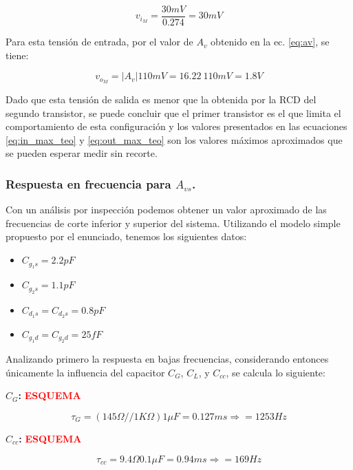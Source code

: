 \documentclass[a4paper, 10pt, spanish]{article}
\begin{document}
\begin{equation}
  v_{i_M}=\frac{30mV}{0.274}=30mV
  \label{eq:in_max_teo}
\end{equation}

Para esta tensión de entrada, por el valor de $A_v$ obtenido en la ec. \ref{eq:av}, se tiene:

\begin{equation}
  v_{o_M}=|A_v|110mV=16.22\ 110mV = 1.8V
  \label{eq:out_max_teo}
\end{equation}

Dado que esta tensión de salida es menor que la obtenida por la RCD del segundo transistor, se puede concluir que el primer transistor es el que limita el comportamiento de esta configuración y los valores presentados en las ecuaciones \ref{eq:in_max_teo} y \ref{eq:out_max_teo} son los valores máximos aproximados que se pueden esperar medir sin recorte.


\subsubsection{Respuesta en frecuencia para $A_{vs}$.}
Con un análisis por inspección podemos obtener un valor aproximado de las frecuencias de corte inferior y superior del sistema. Utilizando el modelo simple propuesto por el enunciado, tenemos los siguientes datos:
\begin{itemize}
  \item $C_{g_1s} = 2.2pF$
  \item $C_{g_2s} = 1.1pF$
  \item $C_{d_1s} = C_{d_2s} = 0.8pF$
  \item $C_{g_1d} = C_{g_2d} = 25fF$
\end{itemize}

Analizando primero la respuesta en bajas frecuencias, considerando entonces únicamente la influencia del capacitor $C_G$, $C_L$, y $C_{cc}$, se calcula lo siguiente:

\textbf{$C_G$:}
\textbf{\textcolor{red}{ESQUEMA}}

\begin{equation}
  \tau_G = (145\Omega//1K\Omega) 1\mu F = 0.127ms \Rightarrow = 1253 Hz
\end{equation}

\textbf{$C_{cc}$:}
\textbf{\textcolor{red}{ESQUEMA}}

\begin{equation}
  \tau_{cc} = 9.4\Omega 0.1\mu F = 0.94ms \Rightarrow = 169 Hz
\end{equation}
\end{document}
